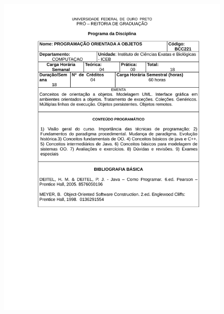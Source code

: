 \begin{figure}[p]
	\centering 
	\includegraphics[scale=0.7]{capitulos/anexo1-programas-disciplina/eg11.pdf}
\end{figure}


